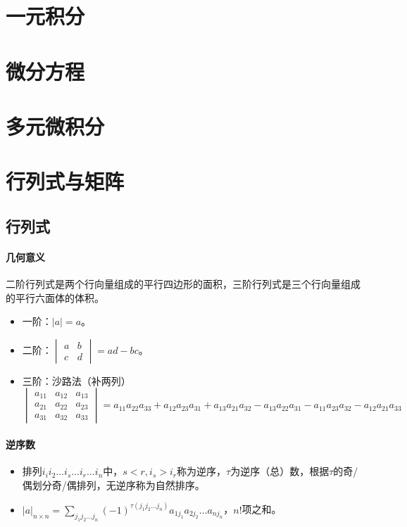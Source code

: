 \documentclass[
12pt, %
a4paper, 
oneside, %
headinclude,footinclude, %
]{scrartcl}
\begin{document}
\section{一元积分}
\section{微分方程}
\section{多元微积分}
\section{行列式与矩阵}
\subsection[行列式]{行列式}
\paragraph{几何意义}
二阶行列式是两个行向量组成的平行四边形的面积，三阶行列式是三个行向量组成的平行六面体的体积。
\begin{itemize}
\item 一阶：$ |a| = a $。
\item 二阶：$\begin{vmatrix} a & b \\ c & d \end{vmatrix} = ad - bc $。
\item 三阶：沙路法（补两列）
$$
\begin{vmatrix}
a_{11} & a_{12} & a_{13} \\
a_{21} & a_{22} & a_{23} \\
a_{31} & a_{32} & a_{33}
\end{vmatrix}
= a_{11}a_{22}a_{33} + a_{12}a_{23}a_{31} + a_{13}a_{21}a_{32} 
- a_{13}a_{22}a_{31} - a_{11}a_{23}a_{32} - a_{12}a_{21}a_{33}
$$
\end{itemize}
\paragraph{逆序数}
\begin{itemize}
\item 排列$ i_i i_2 \dots i_s \dots i_r \dots i_n $中，$ s < r, i_s > i_r $称为逆序，$ \tau $为逆序（总）数，根据$ \tau $的奇/偶划分奇/偶排列，无逆序称为自然排序。
\item $ |a|_{n \times n} = \sum_{j_1 j_2 \dots j_n}(-1)^{\tau(j_1 j_2 \dots j_n)} a_{1 j_{1}} a_{2 j_{2}} \dots a_{n j_{n}} $，$ n! $项之和。
\end{itemize}
\end{document}
